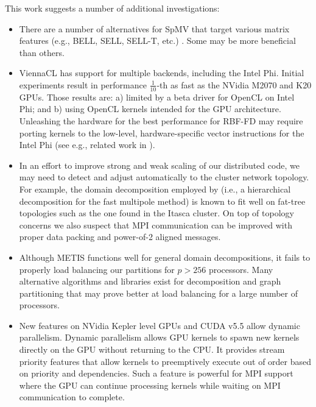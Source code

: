 This work suggests a number of additional investigations:
\begin{itemize}
\item There are a number of alternatives for SpMV that target various matrix features (e.g., BELL, SELL, SELL-T, etc.) \cite{Kreutzer2012,SuKeutzer2012}. Some may be more beneficial than others. 

\item ViennaCL has support for multiple backends, including the Intel Phi. Initial experiments result in performance $\frac{1}{10}$-th as fast as the NVidia M2070 and K20 GPUs. Those results are: a) limited by a beta driver for OpenCL on Intel Phi; and b) using OpenCL kernels intended for the GPU architecture. Unleashing the hardware for the best performance for RBF-FD may require porting kernels to the low-level, hardware-specific vector instructions for the Intel Phi (see e.g., related work in \cite{ErlebacherSauleFlyerBollig2013}).

\item  In an effort to improve strong and weak scaling of our distributed code, we may need to detect and adjust automatically to the cluster network topology. For example, the domain decomposition employed by \cite{Yokota2012} (i.e., a hierarchical decomposition for the fast multipole method) is known to fit well on fat-tree topologies such as the one found in the Itasca cluster. On top of topology concerns we also suspect that MPI communication can be improved with proper data packing and power-of-2 aligned messages.

\item Although METIS functions well for general domain decompositions, it fails to properly load balancing our partitions for $p > 256$ processors. Many alternative algorithms and libraries exist for decomposition and graph partitioning that may prove better at load balancing for a large number of processors. 

\item 
New features on NVidia Kepler level GPUs and CUDA v5.5 allow dynamic parallelism. Dynamic parallelism allows GPU kernels to spawn new kernels directly on the GPU without returning to the CPU. It provides stream priority features that allow kernels to preemptively execute out of order based on priority and dependencies. Such a feature is powerful for MPI support where the GPU can continue processing kernels while waiting on MPI communication to complete.
 

\end{itemize}
